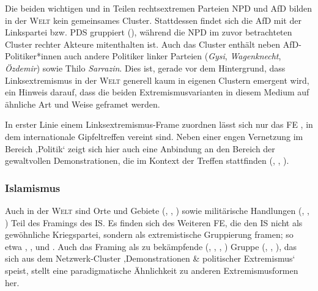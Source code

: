 Die beiden wichtigen und in Teilen rechtsextremen Parteien NPD und AfD bilden in der \textsc{Welt} kein gemeinsames Cluster. Stattdessen findet sich die AfD mit der Linkspartei bzw. PDS gruppiert (), während die NPD im zuvor betrachteten Cluster rechter Akteure mitenthalten ist. Auch das Cluster  enthält neben AfD-Politiker*innen auch andere Politiker linker Parteien (\emph{Gysi}, \emph{Wagenknecht}, \emph{Özdemir}) sowie Thilo \emph{Sarrazin}. Dies ist, gerade vor dem Hintergrund, dass Linksextremismus in der \textsc{Welt} generell kaum in eigenen Clustern emergent wird, ein Hinweis darauf, dass die beiden Extremismusvarianten in diesem Medium auf ähnliche Art und Weise geframet werden.

In erster Linie einem Linksextremismus-Frame zuordnen lässt sich nur das FE , in dem internationale Gipfeltreffen vereint sind. Neben einer engen Vernetzung im Bereich ‚Politik` zeigt sich hier auch eine Anbindung an den Bereich der gewaltvollen Demonstrationen, die im Kontext der Treffen stattfinden (, , ).

\subsubsection{Islamismus}\label{islamismus-10}

Auch in der \textsc{Welt} sind Orte und Gebiete (, , ) sowie militärische Handlungen (, , ) Teil des Framings des IS. Es finden sich des Weiteren FE, die den IS nicht als gewöhnliche Kriegspartei, sondern als extremistische Gruppierung framen; so etwa , ,  und . Auch das Framing als zu bekämpfende (, , , ) Gruppe (, , ), das sich aus dem Netzwerk-Cluster ‚Demonstrationen \& politischer Extremismus` speist, stellt eine paradigmatische Ähnlichkeit zu anderen Extremismusformen her.

